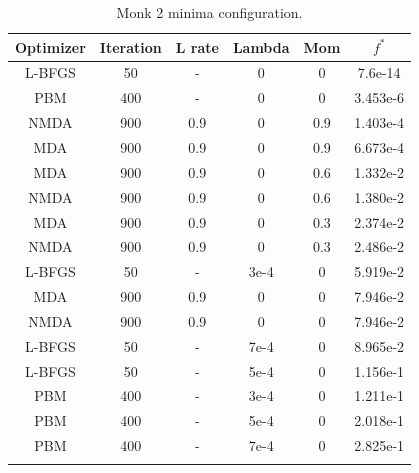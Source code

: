 \begin{longtable}{|c|c|c|c|c|c|}
	\hline
	\centering
	\textbf{Optimizer}&\textbf{Iteration} & \textbf{L rate} & \multicolumn{1}{l|}{\textbf{Lambda}} & \textbf{Mom} & \textbf{$f^{*}$} \\ \hline
	L-BFGS & 50 & - & 0  & 0 & 7.6e-14 \\
	PBM & 400 & - & 0  & 0 & 3.453e-6 \\ 
	NMDA & 900 & 0.9 & 0  & 0.9 & 1.403e-4 \\
	MDA & 900 & 0.9 & 0  & 0.9 & 6.673e-4 \\ 
	MDA & 900 & 0.9 & 0  & 0.6 & 1.332e-2 \\ 
	NMDA & 900 & 0.9 & 0  & 0.6 & 1.380e-2 \\ 
	MDA & 900 & 0.9 & 0  & 0.3 & 2.374e-2  \\ 
	NMDA & 900 & 0.9 & 0  & 0.3 & 2.486e-2 \\ 
	L-BFGS & 50 & - & 3e-4  & 0  & 5.919e-2 \\ 
	MDA & 900 & 0.9 & 0  & 0 & 7.946e-2 \\ 
	NMDA & 900 & 0.9 & 0  & 0 & 7.946e-2 \\ 
	L-BFGS & 50 & - & 7e-4  & 0  & 8.965e-2 \\ 
	L-BFGS & 50 & - & 5e-4  & 0  & 1.156e-1\\ 
	PBM & 400 & - & 3e-4  & 0 & 1.211e-1 \\  
	PBM & 400 & - & 5e-4  & 0 & 2.018e-1 \\ 
	PBM & 400 & - & 7e-4  & 0 & 2.825e-1 \\ 
	\hline
	\caption{Monk 2 minima configuration.}
	\label{tab:nets_res_plots_Monk2}
\end{longtable}

